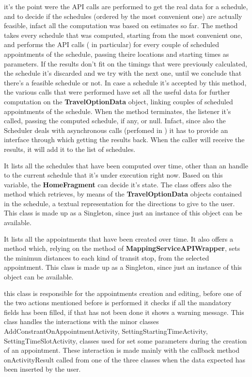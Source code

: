 \label{method:getBestScheduleAsync}  it's the point were the API calls are performed to get the real data for a schedule, and to decide if the schedules (ordered by the most convenient one) are actually feasible, infact all the computation was based on estimates so far.
The method takes every schedule that was computed, starting from the most convenient one, and performs the API calls ( in particular) for every couple of scheduled appointments of the schedule, passing theire locations and starting times as parameters. If the results don't fit on the timings that were previously calculated, the schedule it's discarded and we try with the next one, until we conclude that there's a feasible schedule or not.
In case a schedule it's accepted by this method, the various calls that were performed have set all the useful data for further computation on the \textbf{TravelOptionData} object, linking couples of scheduled appointments of the schedule.
When the method terminates, the listener it's called, passing the computed schedule, if any, or null. Infact, since also the Scheduler deals with asynchronous calls (perfomed in ) it has to provide an interface through which getting the results back.
When the caller will receive the results, it will add it to the list of schedules.

It lists all the schedules that have been computed over time, other than an handle to the current schedule that it's under execution right now. Based on this variable, the \textbf{HomeFragment} can decide it's state. The class offers also the method  which retrieves, by means of the \textbf{TravelOptionData} objects contained in the schedule, a textual representation for the directions to give to the user.
This class is made up as a Singleton, since just an instance of this object can be available.

It lists all the appointments that have been created over time. It also offers a method which, relying on the  method of \textbf{MappingServiceAPIWrapper}, sets the minimun distances to each kind of transit stop, from the selected appointment.
This class is made up as a Singleton, since just an instance of this object can be available.

this class is responsible for the appointments creation and editing, before one of the two actions mentioned before is performed it checks if all the mandatory fields has been filled, if that has not been done it shows a warning message. This class handles the interactions with the minor classes AddConstrantOnAppointmentActivity, SettingStartingTimeActivity, SettingTimeSlotActivity, classes used for set some parameters during the creation of an appointment. These interaction is made mainly with the callback method onActivityResult called from one of the three classes when the data expected has been inserted by the user.

